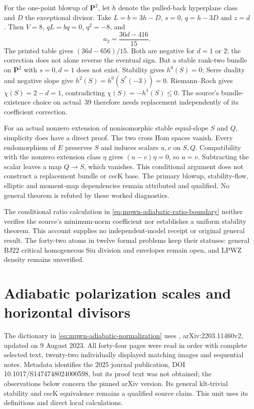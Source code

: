 For the one-point blowup of $\mathbf P^2$, let $h$ denote
the pulled-back hyperplane class and $D$ the exceptional divisor.
Take $L=b=3h-D$, $s=0$, $q=h-3D$ and $z=d$.
Then $V=8$, $qL=bq=0$, $q^2=-8$, and
\[
 a_2=\frac{36d-416}{15}.
\]
The printed table gives $(36d-656)/15$. Both are negative
for $d=1$ or $2$; the correction does not alone reverse the
eventual sign. But a stable rank-two bundle on $\mathbf P^2$
with $s=0,d=1$ does not exist. Stability gives $h^0(S)=0$;
Serre duality and negative slope give
$h^2(S)=h^0(S^*(-3))=0$. Riemann--Roch gives
$\chi(S)=2-d=1$, contradicting $\chi(S)=-h^1(S)\leq0$.
The source's bundle-existence choice on actual~39 therefore
needs replacement independently of its coefficient correction.

For an actual nonzero extension of nonisomorphic stable
equal-slope $S$ and $Q$, simplicity does have a direct proof.
The two cross Hom spaces vanish. Every endomorphism of $E$
preserves $S$ and induces scalars $u,v$ on $S,Q$.
Compatibility with the nonzero extension class $\eta$ gives
$(u-v)\eta=0$, so $u=v$. Subtracting the scalar leaves a
map $Q\to S$, which vanishes. This conditional argument does
not construct a replacement bundle or cscK base. The primary
blowup, stability-flow, elliptic and moment-map dependencies
remain attributed and qualified. No general theorem is refuted
by these worked diagnostics.

The conditional ratio calculation in
\eqref{eq:mpwn-adiabatic-ratio-boundary} neither verifies the
source's minimum-norm coefficient nor establishes a uniform
stability theorem. This account supplies no independent-model
receipt or original general result. The forty-two atoms in
twelve formal problems keep their statuses: general BJ22
critical homogeneous Siu division and envelopes remain open,
and LPWZ density remains unverified.

\section{Adiabatic polarization scales and horizontal divisors}
\label{sec:appL-adiabatic-normalization-boundary}

The dictionary in \eqref{eq:mpwn-adiabatic-normalization} uses
\cite{Hattori23CalabiYauV2}, arXiv:2203.11460v2, updated on
9 August 2023. All forty-four pages were read in order with
complete selected text, twenty-two individually displayed
matching images and sequential notes. Metadata identifies the
2025 journal publication, DOI 10.1017/S1474748024000598, but
its proof text was not obtained; the observations below concern
the pinned arXiv version. Its general klt-trivial stability and
cscK equivalence remains a qualified source claim. This unit
uses its definitions and direct local calculations.

